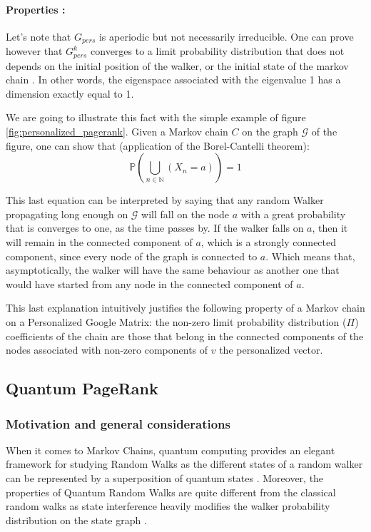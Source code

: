 \documentclass[sn-mathphys]{sn-jnl}%
\theoremstyle{thmstyleone}%
\theoremstyle{thmstyletwo}%
\theoremstyle{thmstylethree}%
\begin{document}
\paragraph{Properties :} 
Let's note that $G_{pers}$ is aperiodic but not necessarily
irreducible. One can prove however that $G_{pers}^k$ converges to a
limit probability distribution that does not depends on the initial
position of the walker, or the initial state of the markov chain
\cite{gleich_2015}. In other words, the eigenspace associated with the
eigenvalue 1 has a dimension exactly equal to 1.

We are going to illustrate this fact with the simple example of figure
\ref{fig:personalized_pagerank}. Given a Markov chain $C$ on the graph
$\mathcal{G}$ of the figure, one can show that (application of the
Borel-Cantelli theorem):
\begin{equation}
    \mathbb{P}(\underset{n\in \mathbb{N}}{\bigcup}(X_n = a)) = 1
\end{equation}

This last equation can be interpreted by saying that any random Walker
propagating long enough on $\mathcal{G}$ will fall on the node $a$
with a great probability that is converges to one, as the time passes
by. If the walker falls on $a$, then it will remain in the connected
component of $a$, which is a strongly connected component, since every
node of the graph is connected to $a$. Which means that,
asymptotically, the walker will have the same behaviour as another one
that would have started from any node in the connected component of
$a$.

This last explanation intuitively justifies the following property of
a Markov chain on a Personalized Google Matrix: the non-zero limit
probability distribution ($\Pi$) coefficients of the chain are those
that belong in the connected components of the nodes associated with
non-zero components of $v$ the personalized vector.

\subsection{Quantum PageRank}

\subsubsection{Motivation and general considerations}

When it comes to Markov Chains, quantum computing provides an elegant
framework for studying Random Walks as the different states of a
random walker can be represented by a superposition of quantum states
\cite{loke_tang_rodriguez_small_wang_2016}. Moreover, the properties
of Quantum Random Walks are quite different from the classical random
walks as state interference heavily modifies the walker probability
distribution on the state graph \cite{kempe_2009}.
\end{document}
